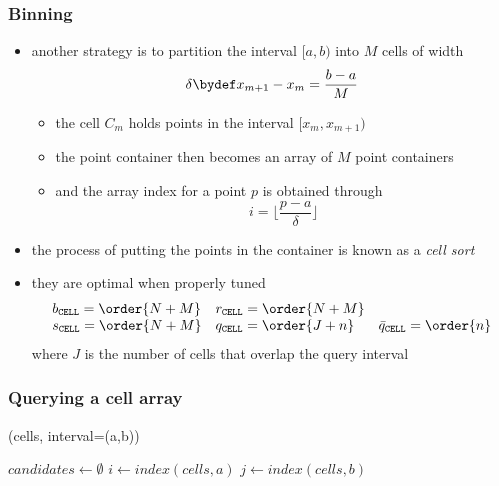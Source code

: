 \begin{frame}[fragile]
%
  \frametitle{Binning}
%
  \begin{itemize}
%
  \item another strategy is to partition the interval $[a,b)$ into $M$ cells of width
    \[
    \delta \bydef x_{m+1} - x_{m} = \frac{b-a}{M}
    \]
    \begin{itemize}
    \item the  cell $C_{m}$ holds points in the interval $[x_{m}, x_{m+1})$
    \item the point container then becomes an array of $M$ point containers
    \item and the array index for a point $p$ is obtained through
      \[
      i = \lfloor \frac{p-a}{\delta} \rfloor
      \]
    \end{itemize}
%
  \item the process of putting the points in the container is known as a {\em cell sort}
%
  \item they are optimal when properly tuned
      \begin{equation*}
        \begin{array}{lll}
          b_{{\tt CELL}} = \order{N + M} &
          r_{{\tt CELL}} = \order{N + M} \\
          s_{{\tt CELL}} = \order{N + M} &
          q_{{\tt CELL}} = \order{J + n} &
          \bar{q}_{{\tt CELL}} = \order{n}
        \end{array}
      \end{equation*}
      where $J$ is the number of cells that overlap the query interval
%
  \end{itemize}
%
\end{frame}

\begin{frame}[fragile]
%
  \frametitle{Querying a cell array}
%
  \begin{center}
    \begin{minipage}{.85\linewidth}
      \begin{algorithm}[H]
        \label{alg:rq-cell}
%
        \DontPrintSemicolon
        \SetAlCapHSkip{0ex}
%
        \caption{\rqcell(cells, interval=(a,b))}
        \vspace{.5em}
%
        $candidates \leftarrow \emptyset$ \;
        $i \leftarrow index(cells, a)$ \;
        $j \leftarrow index(cells, b)$ \;
%
      \end{algorithm}
    \end{minipage}
  \end{center}
%
\end{frame}

